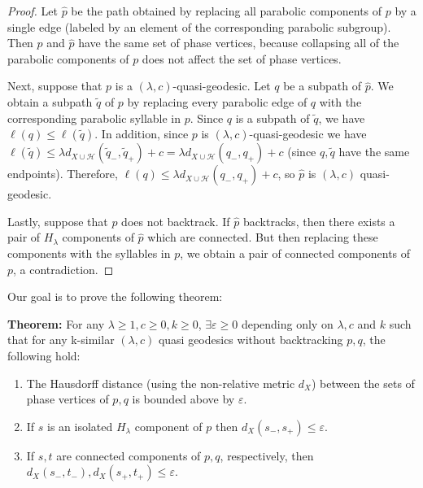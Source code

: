 \documentclass[12pt]{article}
\newcommand{\vs}{\vskip10pt}
\begin{document}
	\begin{proof}
		
		Let $\hat{p}$ be the path obtained by replacing all parabolic components of $p$ by a single edge (labeled by an element of the corresponding parabolic subgroup). Then $p$ and $\hat{p}$ have the same set of phase vertices, because collapsing all of the parabolic components of $p$ does not affect the set of phase vertices. 
		
		\vs 
		
		Next, suppose that $p$ is a $(\lambda, c)$-quasi-geodesic. Let $q$ be a subpath of $\hat{p}$. We obtain a subpath $\tilde{q}$ of $p$ by replacing every parabolic edge of $q$ with the corresponding parabolic syllable in $p$. Since $q$ is a subpath of $\tilde{q}$, we have $\ell(q) \leq \ell(\tilde{q})$. In addition, since $p$ is $(\lambda,c)$-quasi-geodesic we have $\ell(\tilde{q}) \leq \lambda d_{X \cup \mathcal{H}}(\tilde{q}_{-}, \tilde{q}_{+}) + c = \lambda d_{X \cup \mathcal{H}}(q_{-}, q_{+}) + c$ (since $q, \tilde{q}$ have the same endpoints). Therefore, $\ell(q) \leq \lambda d_{X \cup \mathcal{H}}(q_{-}, q_{+}) + c$, so $\hat{p}$ is $(\lambda, c)$ quasi-geodesic.
		
		\vs 
		
		Lastly, suppose that $p$ does not backtrack. If $\hat{p}$ backtracks, then there exists a pair of $H_{\lambda}$ components of $\hat{p}$ which are connected. But then replacing these components with the syllables in $p$, we obtain a pair of connected components of $p$, a contradiction. 
		
	\end{proof}

	Our goal is to prove the following theorem: 
	
	\vs 
	
	\textbf{Theorem: } For any $\lambda \geq 1, c \geq 0, k \geq 0$, $\exists \varepsilon \geq 0$ depending only on $\lambda, c$ and $k$ such that for any k-similar $(\lambda, c)$ quasi geodesics without backtracking $p,q$, the following hold: 
	
	\begin{enumerate}[label = (\alph*)]
		\item The Hausdorff distance (using the non-relative metric $d_X$) between the sets of phase vertices of $p,q$ is bounded above by $\varepsilon$. 
		\item If $s$ is an isolated $H_{\lambda}$ component of $p$ then $d_X(s_{-}, s_{+}) \leq \varepsilon$. 
		\item If $s,t$ are connected components of $p,q$, respectively, then $d_X(s_{-}, t_{-}), d_X(s_{+}, t_{+}) \leq \varepsilon$. 
	\end{enumerate} 
\end{document}
